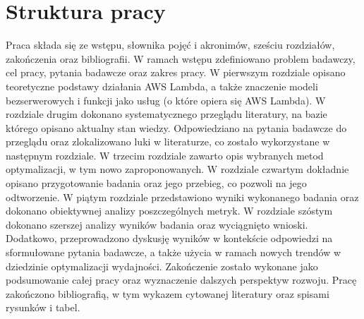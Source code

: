\section*{Struktura pracy}\label{chapter:struktura_pracy}

Praca składa się ze wstępu, słownika pojęć i akronimów, sześciu rozdziałów, zakończenia oraz bibliografii.
W ramach wstępu zdefiniowano problem badawczy, cel pracy, pytania badawcze oraz zakres pracy.
W pierwszym rozdziale opisano teoretyczne podstawy działania AWS Lambda, a także znaczenie modeli bezserwerowych i funkcji jako usług (o które opiera się AWS Lambda).
W rozdziale drugim dokonano systematycznego przeglądu literatury, na bazie którego opisano aktualny stan wiedzy.
Odpowiedziano na pytania badawcze do przeglądu oraz zlokalizowano luki w literaturze, co zostało wykorzystane w następnym rozdziale.
W trzecim rozdziale zawarto opis wybranych metod optymalizacji, w tym nowo zaproponowanych.
W rozdziale czwartym dokładnie opisano przygotowanie badania oraz jego przebieg, co pozwoli na jego odtworzenie.
W piątym rozdziale przedstawiono wyniki wykonanego badania oraz dokonano obiektywnej analizy poszczególnych metryk.
W rozdziale szóstym dokonano szerszej analizy wyników badania oraz wyciągnięto wnioski.
Dodatkowo, przeprowadzono dyskusję wyników w kontekście odpowiedzi na sformułowane pytania badawcze, a także użycia w ramach nowych trendów w dziedzinie optymalizacji wydajności.
Zakończenie zostało wykonane jako podsumowanie całej pracy oraz wyznaczenie dalszych perspektyw rozwoju.
Pracę zakończono bibliografią, w tym wykazem cytowanej literatury oraz spisami rysunków i tabel.
